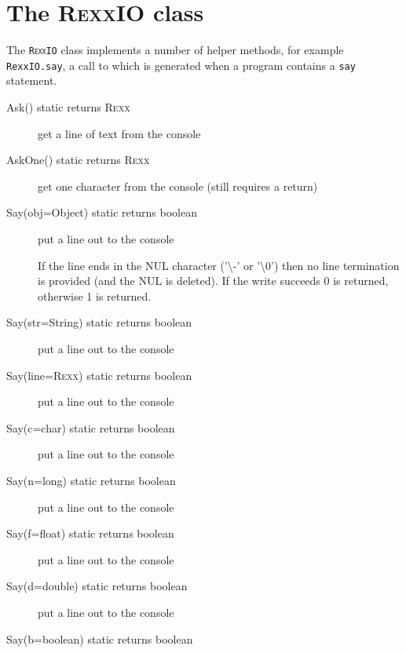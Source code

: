 \section{The R\textsc{exx}IO class}\label{refrexxio}
 
The \texttt{R\textsc{exx}IO} class implements a number of helper methods, for example \texttt{RexxIO.say}, a call to which is generated when a program contains a \texttt{say} statement. 

\begin{description}
  \item[Ask() static returns R\textsc{exx}]

get a line of text from the console
  \item [AskOne() static returns R\textsc{exx}]

get one character from the console (still requires a return)
 \item[Say(obj=Object) static returns boolean]

put a line out to the console

If the line ends in the NUL character ('\textbackslash -' or
    '\textbackslash 0') then no
    line termination is provided (and the NUL is deleted).
    If the write succeeds 0 is returned, otherwise 1 is returned.
 
  \item[Say(str=String) static returns boolean]

put a line out to the console
  \item[Say(line=R\textsc{exx}) static returns boolean]

put a line out to the console
  \item[Say(c=char) static returns boolean]

put a line out to the console
  \item[Say(n=long) static returns boolean]

put a line out to the console
  \item[Say(f=float)   static returns boolean]

put a line out to the console
  \item[Say(d=double)  static returns boolean]

put a line out to the console
  \item[Say(b=boolean) static returns boolean]


\end{description}

